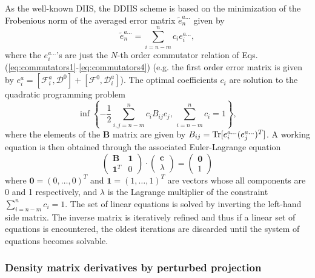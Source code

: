 \documentclass[prl,aps,letterpaper,twocolumn,showpacs,twocolumngrid,superbib]{revtex4}
\def\Tr{{\rm Tr}}
\def\F{\mathcal{F}}
\def\D{\mathcal{D}}
\begin{document}
As the well-known DIIS, the DDIIS scheme is based on the 
minimization of the Frobenious norm of the averaged error 
matrix $\widetilde e_n^{a\ldots}$ given by
\begin{equation}
  \widetilde e_n^{a\ldots}=\sum_{i=n-m}^{n}c_i e_i^{a\ldots},
\end{equation}
where the $e_i^{a\ldots}$'s are just the $N$-th order commutator relation
of Eqs. (\ref{eq:commutators1}-\ref{eq:commutators4}) (e.g. the first order error matrix 
is given by $e_i^{a}=[\F^{a}_i ,\D^{0}]+[\F^{0},\D^{a}_i]$).
The optimal coefficients $c_i$ are solution to the 
quadratic programming problem
\begin{equation}
  \inf \left \{-\frac{1}{2}\sum_{i,j=n-m}^nc_iB_{ij}c_j,\, \sum_{i=n-m}^n c_i=1 \right \},
\end{equation}
where the elements of the $\mathbf{B}$ matrix are given by 
$B_{ij}=\Tr[e_i^{a\ldots}(e_j^{a\ldots})^T]$.
A working equation is then obtained through the associated Euler-Lagrange equation
\begin{equation}\label{eq:diismatrix}
 \left ( \begin{array}{cc}
     \mathbf{B}     & \mathbf{1} \\
     \mathbf{1}^{T} & 0 
   \end{array}\right )
 \cdot \left ( \begin{array}{c}
     \mathbf{c}     \\
     \lambda  
   \end{array}\right )
  =  \left ( \begin{array}{c}
     \mathbf{0}      \\
         1  
   \end{array}\right )
\end{equation}
 where $\mathbf{0}=(0,\ldots,0)^{T}$ and $\mathbf{1}=(1,\ldots,1)^{T}$ are
 vectors whose all components are 0 and 1 respectively, 
 and $\lambda$ is the Lagrange multiplier of the constraint 
 $\sum_{i=n-m}^{n}c_{i}=1$. The set of linear equations is solved
 by inverting the left-hand side matrix. The inverse matrix is iteratively 
 refined and thus if a linear set of equations is encountered, the oldest
 iterations are discarded until the system of equations becomes solvable.

\subsubsection{Density matrix derivatives by perturbed projection}
\end{document}
